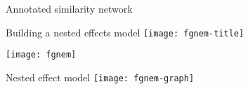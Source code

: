\documentclass[aspectratio=169]{beamer}
\begin{document}

\begin{frame}{Annotated similarity network}
\centering
{}
\end{frame}


\begin{frame}{Building a nested effects model}
\centering
\texttt{[image: fgnem-title]}


\texttt{[image: fgnem]}
\end{frame}

\begin{frame}{Nested effect model}
\centering
\texttt{[image: fgnem-graph]}
\end{frame}
\end{document}
